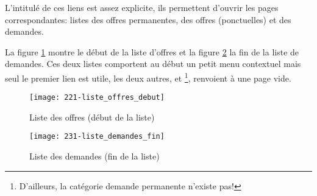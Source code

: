 L'intitulé de ces liens est assez explicite, ils permettent d’ouvrir les pages correspondantes: listes des offres permanentes, des offres (ponctuelles) et des demandes. 


La figure \ref{fig:offresDebut} montre le début de la liste d’offres et la figure \ref{fig:demandesFin} la fin de la liste de demandes. Ces deux listes comportent au début un petit menu contextuel mais seul le premier lien  est utile, les deux autres,  et %
\footnote{D'ailleurs, la catégorie demande permanente n'existe pas!},
renvoient à une page vide.
\begin{figure}
    \texttt{[image: 221-liste\_offres\_debut]}
    \caption[Liste des offres]{Liste des offres (début de la liste)}
    \label{fig:offresDebut}
\end{figure}
\begin{figure}
    \texttt{[image: 231-liste\_demandes\_fin]}
    \caption[Liste des demandes]{Liste des demandes (fin de la liste)}
    \label{fig:demandesFin}
\end{figure}


